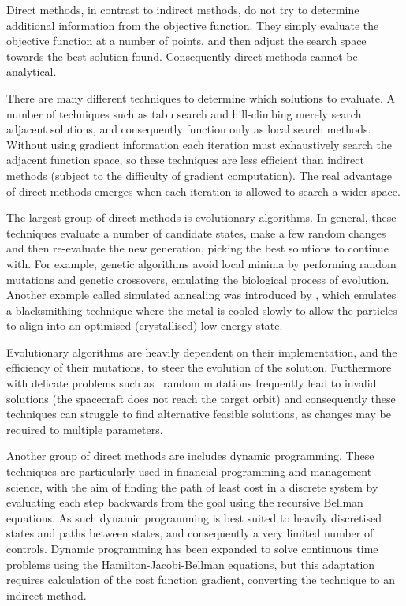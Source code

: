 Direct methods, in contrast to indirect methods, do not try to determine additional information from the objective function. They simply evaluate the objective function at a number of points, and then adjust the search space towards the best solution found. Consequently direct methods cannot be analytical. %

There are many different techniques to determine which solutions to evaluate. A number of techniques such as tabu search and hill-climbing merely search adjacent solutions, and consequently function only as local search methods. Without using gradient information each iteration must exhaustively search the adjacent function space, so these techniques are less efficient than indirect methods (subject to the difficulty of gradient computation). The real advantage of direct methods emerges when each iteration is allowed to search a wider space.

The largest group of direct methods is evolutionary algorithms. In general, these techniques evaluate a number of candidate states, make a few random changes and then re-evaluate the new generation, picking the best solutions to continue with. For example, genetic algorithms avoid local minima by performing random mutations and genetic crossovers, emulating the biological process of evolution. Another example called simulated annealing was introduced by \textcite{Kirkpatrick1983}, which emulates a blacksmithing technique where the metal is cooled slowly to allow the particles to align into an optimised (crystallised) low energy state. 

Evolutionary algorithms are heavily dependent on their implementation, and the efficiency of their mutations, to steer the evolution of the solution. Furthermore with delicate problems such as \BW\ random mutations frequently lead to invalid solutions (the spacecraft does not reach the target orbit) and consequently these techniques can struggle to find alternative feasible solutions, as changes may be required to multiple parameters.

Another group of direct methods are includes dynamic programming. These techniques are particularly used in financial programming and management science, with the aim of finding the path of least cost in a discrete system by evaluating each step backwards from the goal using the recursive Bellman equations. As such dynamic programming is best suited to heavily discretised states and paths between states, and consequently a very limited number of controls. Dynamic programming has been expanded to solve continuous time problems using the Hamilton-Jacobi-Bellman equations, but this adaptation requires calculation of the cost function gradient, converting the technique to an indirect method. 

